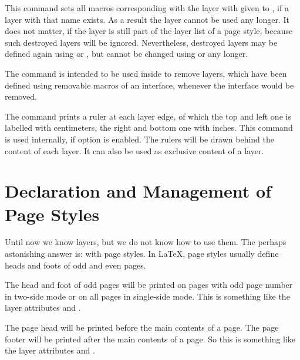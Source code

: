 \begin{Declaration}
\end{Declaration}
%
This command sets all macros corresponding with the layer with given
 to , if a layer with that name exists. As a result the layer cannot be used any longer. It does not matter, if the layer
is still part of the layer list of a page style, because such destroyed layers
will be ignored. Nevertheless, destroyed layers may be defined again using
 or , but cannot be changed using
 or  any longer. 

The command is intended to be used inside
 to remove layers, which have been
defined using removable macros of an interface, whenever the interface would
be removed.%

\begin{Declaration}
\end{Declaration}
%
The command  prints a ruler at each layer edge, of
which the top and left one is labelled with centimeters, the right and bottom
one with inches.  This command is used internally, if option
 is enabled. The rulers will be drawn behind
the content of each layer.  It can also be used as exclusive content of a
layer.%


\section{Declaration and Management of Page Styles}
\label{sec:scrlayer.pagestyles}

Until now we know layers, but we do not know how to use them. The
perhaps astonishing answer is: with page styles. In \LaTeX{}, page
styles usually define heads and foots of odd and even pages.

The head and foot of odd pages will be printed on pages with odd
page number in two-side mode or on all pages in single-side mode. This is
something like the layer attributes  and .

The page head will be printed before the main contents of a page. The page
footer will be printed after the main contents of a page. So this is something
like the layer attributes  and .

